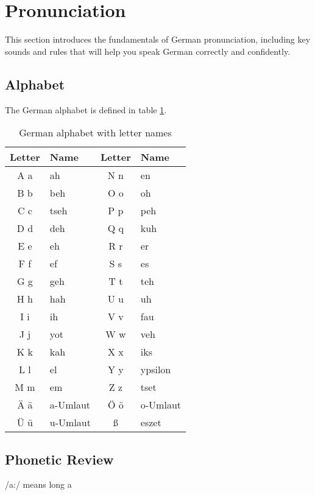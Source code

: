 \section{Pronunciation}\label{sec:pronunciation}

This section introduces the fundamentals of German pronunciation, including key sounds and rules that will help you speak German correctly and confidently.

\subsection{Alphabet}\label{subsec:alphabet}

The German alphabet is defined in table \ref{tab:germanAlphabet}.

\begin{table}[h]
    \centering
    \begin{tabular}{|c|l||c|l|}
    \hline
    Letter & Name & Letter & Name \\
    \hline
    A a & ah & N n & en \\
    B b & beh & O o & oh \\
    C c & tseh & P p & peh \\
    D d & deh & Q q & kuh \\
    E e & eh & R r & er \\
    F f & ef & S s & es \\
    G g & geh & T t & teh \\
    H h & hah & U u & uh \\
    I i & ih & V v & fau \\
    J j & yot & W w & veh \\
    K k & kah & X x & iks \\
    L l & el & Y y & ypsilon \\
    M m & em & Z z & tset \\
    Ä ä & a-Umlaut & Ö ö & o-Umlaut \\
    Ü ü & u-Umlaut & \ss{} & eszet \\
    \hline
    \end{tabular}
    \caption{German alphabet with letter names}
    \label{tab:germanAlphabet}
    \end{table}

\subsection{Phonetic Review}\label{subsec:phoneticReview}

/a:/ means long a


